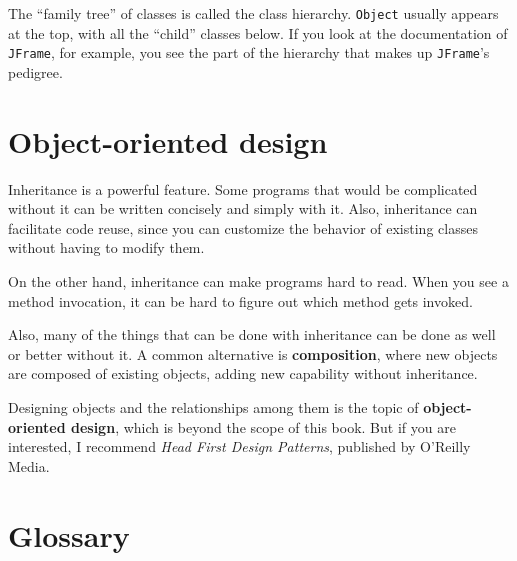 The ``family tree'' of classes is called the class hierarchy.  {\tt Object}
usually appears at the top, with all the ``child'' classes below.  If
you look at the documentation of {\tt JFrame}, for example, you
see the part of the hierarchy that makes up {\tt JFrame}'s pedigree.


\section{Object-oriented design}

Inheritance is a powerful feature.  Some programs that would be
complicated without it can be written concisely and simply
with it.  Also, inheritance can facilitate code reuse, since you can
customize the behavior of existing classes without having to modify
them.

On the other hand, inheritance can make programs hard to read.  When
you see a method invocation, it can be hard to figure out which method
gets invoked.

Also, many of the things that can be done with inheritance can
be done as well or better without it.
A common alternative is {\bf composition}, where new objects are
composed of existing objects, adding new capability without
inheritance.

Designing objects and the relationships among them is the topic
of {\bf object-oriented design}, which is beyond the scope of this
book.  But if you are interested, I recommend {\em Head First Design
Patterns}, published by O'Reilly Media.


\section{Glossary}


